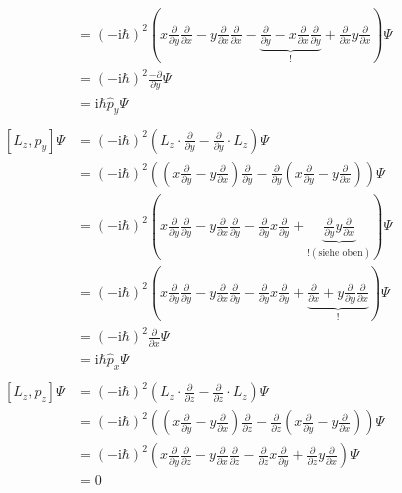 \begin{align*}
        &= \left( -\text{i}\hbar \right)^2 \left( x\frac{\partial}{\partial y}\frac{\partial}{\partial x} - y\frac{\partial}{\partial x}\frac{\partial}{\partial x} - \underbrace{\frac{\partial}{\partial y} - x\frac{\partial}{\partial x} \frac{\partial}{\partial y}}_{!} + \frac{\partial}{\partial x}y \frac{\partial}{\partial x} \right)\Psi\\
        &= \left( -\text{i}\hbar \right)^2 \frac{-\partial}{\partial y}\Psi\\
        &= \text{i}\hbar \hat{p}_y \Psi\\
        \\
        \left[ L_z,p_y \right]\Psi &= \left( -\text{i}\hbar \right)^2 \left( L_z\cdot \frac{\partial}{\partial y} - \frac{\partial}{\partial y} \cdot L_z \right) \Psi\\
        &= \left( -\text{i}\hbar \right)^2 \left( \left( x\frac{\partial}{\partial y} - y\frac{\partial}{\partial x} \right) \frac{\partial}{\partial y} - \frac{\partial}{\partial y} \left( x\frac{\partial}{\partial y} - y\frac{\partial}{\partial x} \right) \right)\Psi\\
        &= \left( -\text{i}\hbar \right)^2 \left( x\frac{\partial}{\partial y} \frac{\partial}{\partial y} - y\frac{\partial}{\partial x} \frac{\partial}{\partial y} - \frac{\partial}{\partial y} x\frac{\partial}{\partial y} + \underbrace{\frac{\partial}{\partial y} y\frac{\partial}{\partial x}}_{! (\text{siehe oben})} \right)\Psi\\
        &= \left( -\text{i}\hbar \right)^2 \left( x\frac{\partial}{\partial y} \frac{\partial}{\partial y} - y\frac{\partial}{\partial x} \frac{\partial}{\partial y} - \frac{\partial}{\partial y} x\frac{\partial}{\partial y} + \underbrace{\frac{\partial}{\partial x} + y\frac{\partial}{\partial y} \frac{\partial}{\partial x}}_{!} \right)\Psi\\
        &= \left( -\text{i}\hbar \right)^2 \frac{\partial}{\partial x}\Psi\\
        &= \text{i}\hbar \hat{p}_x \Psi\\
        \\
        \left[ L_z,p_z \right]\Psi &= \left( -\text{i}\hbar \right)^2 \left( L_z\cdot \frac{\partial}{\partial z} - \frac{\partial}{\partial z} \cdot L_z \right)\Psi\\
        &= \left( -\text{i}\hbar \right)^2 \left( \left( x\frac{\partial}{\partial y} - y\frac{\partial}{\partial x} \right) \frac{\partial}{\partial z} - \frac{\partial}{\partial z} \left( x\frac{\partial}{\partial y} - y\frac{\partial}{\partial x} \right) \right)\Psi\\
        &= \left( -\text{i}\hbar \right)^2 \left( x\frac{\partial}{\partial y} \frac{\partial}{\partial z} - y\frac{\partial}{\partial x} \frac{\partial}{\partial z} - \frac{\partial}{\partial z}x\frac{\partial}{\partial y} + \frac{\partial}{\partial z}y\frac{\partial}{\partial x} \right)\Psi\\
        &= 0\\
    \end{align*}

